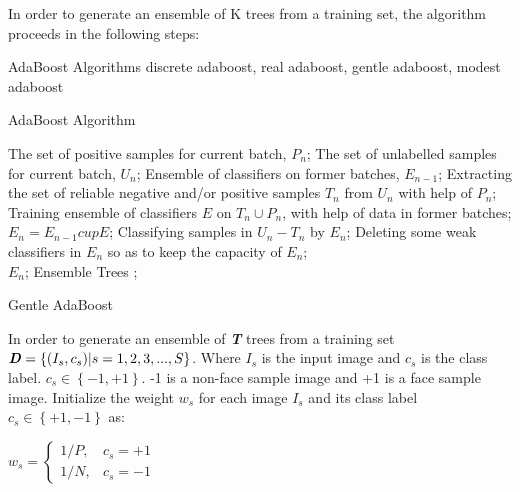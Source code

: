 \begin{compactitem}
In order to generate an ensemble of K trees from a training set, the algorithm proceeds in the
following steps:

\item{AdaBoost Algorithms}
discrete adaboost, real adaboost, gentle adaboost, modest adaboost

\begin{algorithm}[htb]
  \caption{ AdaBoost Algorithm}
  \label{alg:adaboost}
  \begin{algorithmic}[1]
    \Require
      The set of positive samples for current batch, $P_n$;
      The set of unlabelled samples for current batch, $U_n$;
      Ensemble of classifiers on former batches, $E_{n-1}$;
    \State Extracting the set of reliable negative and/or positive samples $T_n$ from $U_n$ with help of $P_n$;
    \label{code:fram:extract}
    \State Training ensemble of classifiers $E$ on $T_n \cup P_n$, with help of data in former batches;
    \label{code:fram:trainbase}
    \State $E_n=E_{n-1}cup E$;
    \label{code:fram:add}
    \State Classifying samples in $U_n-T_n$ by $E_n$;
    \label{code:fram:classify}
    \State Deleting some weak classifiers in $E_n$ so as to keep the capacity of $E_n$;
    \label{code:fram:select} \\
    \Return $E_n$;
    \Ensure
      Ensemble Trees ;
  \end{algorithmic}
\end{algorithm}


\begin{algorithm}[htb]
  \caption{ Gentle AdaBoost}
  \label{alg:GentleAdaBoost}
  \begin{algorithmic}[1]
    \Require
	In order to generate an ensemble of \textbf{\textit{T}} trees from a training set
	$\textbf{\textit{D}}=\left\{ { (I_s,c_s) | s=1,2,3,...,S}\right\}$.
	Where $I_s$ is the input image and $c_s$ is the class label. $c_s \in \left\{{-1,+1 } \right\}$.
	-1 is a non-face sample image and +1 is a face sample image.
    \State Initialize the weight $w_s$ for each image $I_s$ and its class label $c_s \in
    	\left\{ {+1,-1}\right\}$ as:

    $w_s=
	\begin{cases}
    1/P,	& c_s = +1 \\
    1/N,    & c_s = -1
	\end{cases}$


\end{algorithmic}
\end{algorithm}
\end{compactitem}

